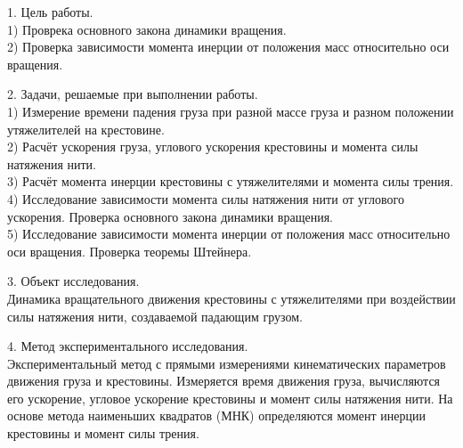 \documentclass[12pt]{article}
\begin{document}
\noindent\makebox[\linewidth]{\rule{\textwidth}{1pt}}
\noindent\makebox[\linewidth]{\rule{\textwidth}{1pt}}

\begin{flushleft}
    1. Цель работы.\\
    \hspace{0.63cm}1) Проврека основного закона динамики вращения. \\
    \hspace{0.63cm}2) Проверка зависимости момента инерции от
    положения масс относительно оси вращения.

\end{flushleft}

\begin{flushleft}
    2. Задачи, решаемые при выполнении работы.\\
    \hspace{0.63cm} 1) Измерение времени падения груза при разной массе груза и разном положении утяжелителей на крестовине. \\
    \hspace{0.63cm} 2) Расчёт ускорения груза, углового ускорения крестовины и момента силы натяжения нити. \\
    \hspace{0.63cm} 3) Расчёт момента инерции крестовины с утяжелителями и момента силы трения. \\
    \hspace{0.63cm} 4) Исследование зависимости момента силы натяжения нити от углового ускорения. Проверка основного закона динамики вращения. \\
    \hspace{0.63cm} 5) Исследование зависимости момента инерции от положения масс относительно оси вращения. Проверка теоремы Штейнера. \\
\end{flushleft}

\begin{flushleft}
    3. Объект исследования. \\
    Динамика вращательного движения крестовины с утяжелителями
    при воздействии силы натяжения нити, создаваемой падающим грузом. \\
\end{flushleft}

\begin{flushleft}
    4. Метод экспериментального исследования. \\
    Экспериментальный метод с прямыми измерениями кинематических параметров движения 
    груза и крестовины. Измеряется время движения груза, вычисляются его ускорение, 
    угловое ускорение крестовины и момент силы натяжения нити. На основе метода
    наименьших квадратов (МНК) определяются момент инерции крестовины и момент
    силы трения. \\

\end{flushleft}
\end{document}

